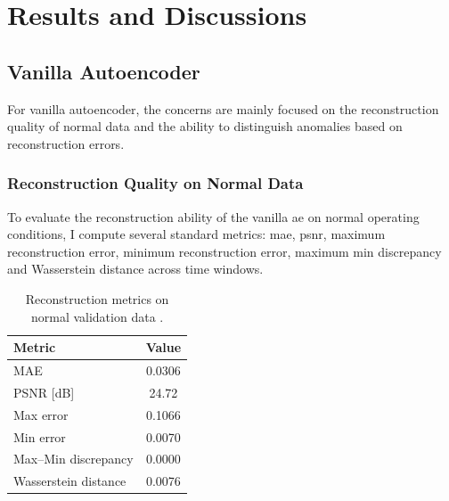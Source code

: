 \chapter{Results and Discussions}
\label{ch:results}




\ifpdf
    \graphicspath{{5_results/figures/}{5_results/figures/}
            {5_results/figures/}}
\else
    \graphicspath{{5_results/figures/EPS/}{5_results/figures/}}
\fi



\section{Vanilla Autoencoder}
\label{sec:vanilla-ae-results}
For vanilla autoencoder, the concerns are mainly focused on the reconstruction quality of normal data and the ability to distinguish anomalies based on reconstruction errors.


\subsection{Reconstruction Quality on Normal Data}
To evaluate the reconstruction ability of the vanilla \gls{ae} on normal operating conditions, I compute several standard metrics: \gls{mae}, \gls{psnr}, maximum reconstruction error, minimum reconstruction error, maximum min discrepancy and Wasserstein distance across time windows.

\begin{table}[h!]
\centering
\caption{Reconstruction metrics on normal validation data .}
\label{tab:rec_metrics_normal}
\begin{tabular}{lc}
\toprule
\textbf{Metric} & \textbf{Value} \\
\midrule
MAE                  & 0.0306 \\
PSNR [dB]            & 24.72 \\
Max error            & 0.1066 \\
Min error            & 0.0070 \\
Max--Min discrepancy & 0.0000 \\
Wasserstein distance & 0.0076 \\
\bottomrule
\end{tabular}
\end{table}

